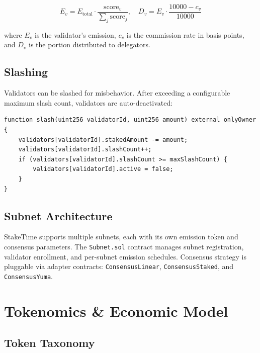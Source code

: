 \documentclass[11pt,a4paper]{article}
\begin{document}
\begin{equation}
E_v = E_{\text{total}} \cdot \frac{\text{score}_v}{\sum_j \text{score}_j}, \quad
D_v = E_v \cdot \frac{10000 - c_v}{10000}
\label{eq:emission}
\end{equation}

where $E_v$ is the validator's emission, $c_v$ is the commission rate in basis points, and $D_v$ is the portion distributed to delegators.

\subsection{Slashing}

Validators can be slashed for misbehavior. After exceeding a configurable maximum slash count, validators are auto-deactivated:

\begin{lstlisting}[style=solidity]
function slash(uint256 validatorId, uint256 amount) external onlyOwner {
    validators[validatorId].stakedAmount -= amount;
    validators[validatorId].slashCount++;
    if (validators[validatorId].slashCount >= maxSlashCount) {
        validators[validatorId].active = false;
    }
}
\end{lstlisting}

\subsection{Subnet Architecture}

StakeTime supports multiple subnets, each with its own emission token and consensus parameters. The \texttt{Subnet.sol} contract manages subnet registration, validator enrollment, and per-subnet emission schedules. Consensus strategy is pluggable via adapter contracts: \texttt{ConsensusLinear}, \texttt{ConsensusStaked}, and \texttt{ConsensusYuma}.

\section{Tokenomics \& Economic Model}
\label{sec:tokenomics}

\subsection{Token Taxonomy}
\end{document}
